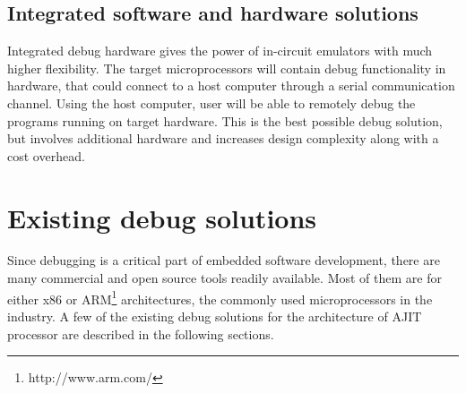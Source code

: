 \subsection{Integrated software and hardware solutions}
Integrated debug hardware gives the power of in-circuit emulators with much higher flexibility. The target microprocessors will contain debug functionality in hardware, that could connect to a host computer through a serial communication channel. Using the host computer, user will be able to remotely debug the programs running on target hardware. This is the best possible debug solution, but involves additional hardware and increases design complexity along with a cost overhead.

\section{Existing debug solutions}
Since debugging is a critical part of embedded software development, there are many commercial and open source tools readily available. Most of them are for either x86 or ARM\footnote{http://www.arm.com/} architectures, the commonly used microprocessors in the industry. A few of the existing debug solutions for the architecture of AJIT processor are described in the following sections.

